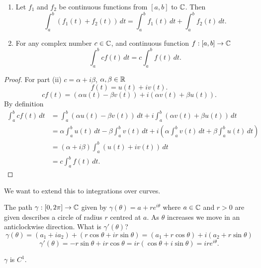 \documentclass[10pt, a4paper]{article}
\begin{document}
\begin{lemma}\phantom{}
    \begin{enumerate}[label = (\roman*)]
        \item Let $f_1$ and $f_2$ be continuous functions from $[a, b]$ to $\mathbb{C}$.
        Then
        \[
        \int_{a}^{b}(f_1(t) + f_2(t))\,dt = \int_{a}^{b}f_1(t)\,dt + \int_{a}^{b}f_2(t)\,dt.
        \]
    
        \item For any complex number $c \in \mathbb{C}$,
        and continuous function $f : [a, b] \to \mathbb{C}$
        \[
        \int_{a}^{b}cf(t)\,dt = c\int_{a}^{b}f(t)\,dt.
        \]
    \end{enumerate}

    \begin{proof}
        For part
        (ii)
        $c = \alpha + i\beta$,
        $\alpha, \beta \in \mathbb{R}$
        \[
        f(t) = u(t) + iv(t).
        \]
        \[
        cf(t) = (\alpha u(t) - \beta v(t)) + i(\alpha v(t) + \beta u(t)).
        \]
        By definition
        \begin{align*}
            \int_{a}^{b}cf(t)\,dt &= \int_{a}^{b}(\alpha u(t) - \beta v(t))\,dt + i\int_{a}^{b}(\alpha v(t) + \beta u(t))\,dt \\
            &= \alpha\int_{a}^{b}u(t)\,dt - \beta\int_{a}^{b}v(t)\,dt + i\left(\alpha\int_{a}^{b}v(t)\,dt + \beta\int_{a}^{b}u(t)\,dt\right) \\
            &= (\alpha + i\beta)\int_{a}^{b}(u(t) + iv(t))\,dt \\
            &= c\int_{a}^{b}f(t)\,dt.
        \end{align*}
    \end{proof}
\end{lemma}

We want to extend this to integrations over curves.

\begin{example}
    The path $\gamma : [0, 2\pi] \to \mathbb{C}$ given by $\gamma(\theta) = a + re ^ {i\theta}$ where $a \in \mathbb{C}$ and $r > 0$ are given describes a circle of radius $r$ centred at $a$.
    As $\theta$ increases we move in an anticlockwise direction.
    What is $\gamma'(\theta)$?
    \[
    \gamma(\theta) = (a_1 + ia_2) + (r\cos{\theta} + ir\sin{\theta}) = (a_1 + r\cos{\theta}) + i(a_2 + r\sin{\theta})
    \]
    \[
    \gamma'(\theta) = -r\sin{\theta} + ir\cos{\theta} = ir(\cos{\theta} + i\sin{\theta}) = ire ^ {i\theta}.
    \]

    $\gamma$ is $C ^ 1$.
\end{example}
\end{document}
